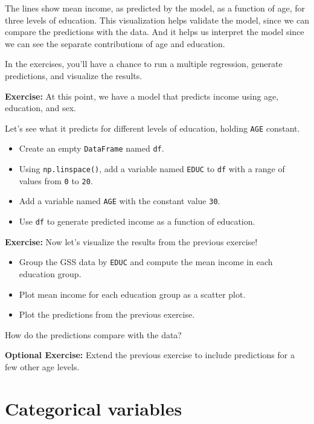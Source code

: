 The lines show mean income, as predicted by the model, as a function of
age, for three levels of education. This visualization helps validate
the model, since we can compare the predictions with the data. And it
helps us interpret the model since we can see the separate contributions
of age and education.

In the exercises, you'll have a chance to run a multiple regression,
generate predictions, and visualize the results.

\textbf{Exercise:} At this point, we have a model that predicts income
using age, education, and sex.

Let's see what it predicts for different levels of education, holding
\passthrough{\lstinline!AGE!} constant.

\begin{itemize}
\item
  Create an empty \passthrough{\lstinline!DataFrame!} named
  \passthrough{\lstinline!df!}.
\item
  Using \passthrough{\lstinline!np.linspace()!}, add a variable named
  \passthrough{\lstinline!EDUC!} to \passthrough{\lstinline!df!} with a
  range of values from \passthrough{\lstinline!0!} to
  \passthrough{\lstinline!20!}.
\item
  Add a variable named \passthrough{\lstinline!AGE!} with the constant
  value \passthrough{\lstinline!30!}.
\item
  Use \passthrough{\lstinline!df!} to generate predicted income as a
  function of education.
\end{itemize}

\textbf{Exercise:} Now let's visualize the results from the previous
exercise!

\begin{itemize}
\item
  Group the GSS data by \passthrough{\lstinline!EDUC!} and compute the
  mean income in each education group.
\item
  Plot mean income for each education group as a scatter plot.
\item
  Plot the predictions from the previous exercise.
\end{itemize}

How do the predictions compare with the data?

\textbf{Optional Exercise:} Extend the previous exercise to include
predictions for a few other age levels.

\hypertarget{categorical-variables}{%
\section{Categorical variables}\label{categorical-variables}}

